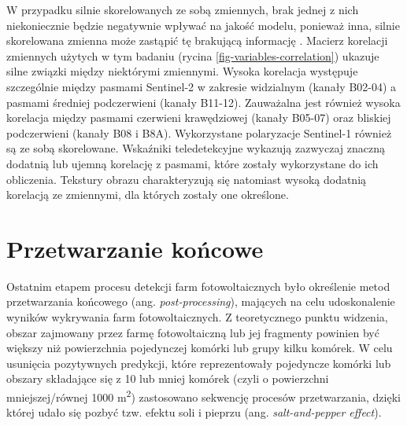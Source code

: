 \documentclass{amuthesis}
\begin{document}
W przypadku silnie skorelowanych ze sobą zmiennych, brak jednej z nich
niekoniecznie będzie negatywnie wpływać na jakość modelu, ponieważ inna,
silnie skorelowana zmienna może zastąpić tę brakującą informację
\autocite{biecek_2021_model_analysis}. Macierz korelacji zmiennych
użytych w tym badaniu (rycina \ref{fig-variables-correlation}) ukazuje
silne związki między niektórymi zmiennymi. Wysoka korelacja występuje
szczególnie między pasmami Sentinel-2 w zakresie widzialnym (kanały
B02-04) a pasmami średniej podczerwieni (kanały B11-12). Zauważalna jest
również wysoka korelacja między pasmami czerwieni krawędziowej (kanały
B05-07) oraz bliskiej podczerwieni (kanały B08 i B8A). Wykorzystane
polaryzacje Sentinel-1 również są ze sobą skorelowane. Wskaźniki
teledetekcyjne wykazują zazwyczaj znaczną dodatnią lub ujemną korelację
z pasmami, które zostały wykorzystane do ich obliczenia. Tekstury obrazu
charakteryzują się natomiast wysoką dodatnią korelacją ze zmiennymi, dla
których zostały one określone.

\hypertarget{sec-post-processing}{%
\section{Przetwarzanie końcowe}\label{sec-post-processing}}

Ostatnim etapem procesu detekcji farm fotowoltaicznych było określenie
metod przetwarzania końcowego (ang. \emph{post-processing}), mających na
celu udoskonalenie wyników wykrywania farm fotowoltaicznych. Z
teoretycznego punktu widzenia, obszar zajmowany przez farmę
fotowoltaiczną lub jej fragmenty powinien być większy niż powierzchnia
pojedynczej komórki lub grupy kilku komórek. W celu usunięcia
pozytywnych predykcji, które reprezentowały pojedyncze komórki lub
obszary składające się z 10 lub mniej komórek (czyli o powierzchni
mniejszej/równej 1000 m\textsuperscript{2}) zastosowano sekwencję
procesów przetwarzania, dzięki której udało się pozbyć tzw. efektu soli
i pieprzu (ang. \emph{salt-and-pepper effect}).
\end{document}
